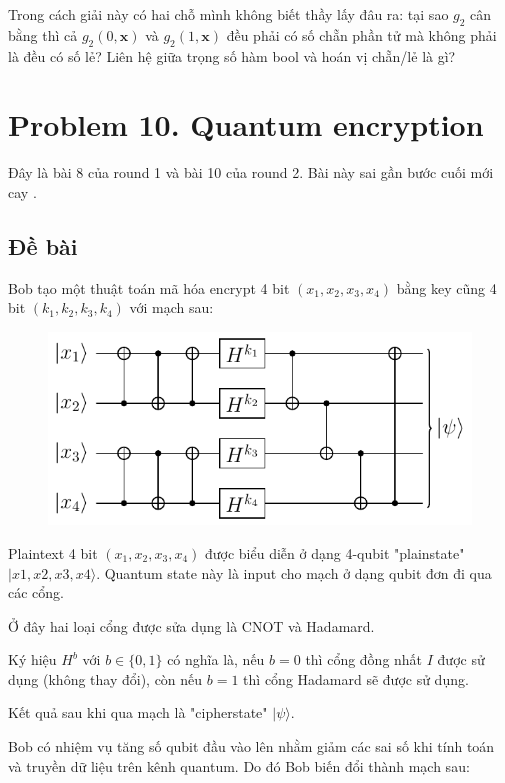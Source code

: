 Trong cách giải này có hai chỗ mình không biết thầy lấy đâu ra: tại sao $g_2$ cân bằng thì cả $g_2(0, \bm{x})$ và $g_2(1, \bm{x})$ đều phải có số chẵn phần tử mà không phải là đều có số lẻ? Liên hệ giữa trọng số hàm bool và hoán vị chẵn/lẻ là gì?

\section*{Problem 10. Quantum encryption}

Đây là bài 8 của round 1 và bài 10 của round 2. Bài này sai gần bước cuối mới cay .

\subsection*{Đề bài}

Bob tạo một thuật toán mã hóa encrypt 4 bit $(x_1, x_2, x_3, x_4)$ bằng key cũng 4 bit $(k_1, k_2, k_3, k_4)$ với mạch sau:

\begin{figure}[ht]
    \centering
    \includegraphics[page=1]{nsucrypto/2023/problem10_figures.pdf}
\end{figure}

Plaintext 4 bit $(x_1, x_2, x_3, x_4)$ được biểu diễn ở dạng 4-qubit "plainstate" $\lvert x1, x2, x3, x4 \rangle$. Quantum state này là input cho mạch ở dạng qubit đơn đi qua các cổng.

Ở đây hai loại cổng được sửa dụng là CNOT và Hadamard.

Ký hiệu $H^b$ với $b \in \{ 0, 1 \}$ có nghĩa là, nếu $b = 0$ thì cổng đồng nhất $I$ được sử dụng (không thay đổi), còn nếu $b = 1$ thì cổng Hadamard sẽ được sử dụng.

Kết quả sau khi qua mạch là "cipherstate" $\lvert \psi \rangle$.

Bob có nhiệm vụ tăng số qubit đầu vào lên nhằm giảm các sai số khi tính toán và truyền dữ liệu trên kênh quantum. Do đó Bob biến đổi thành mạch sau:

